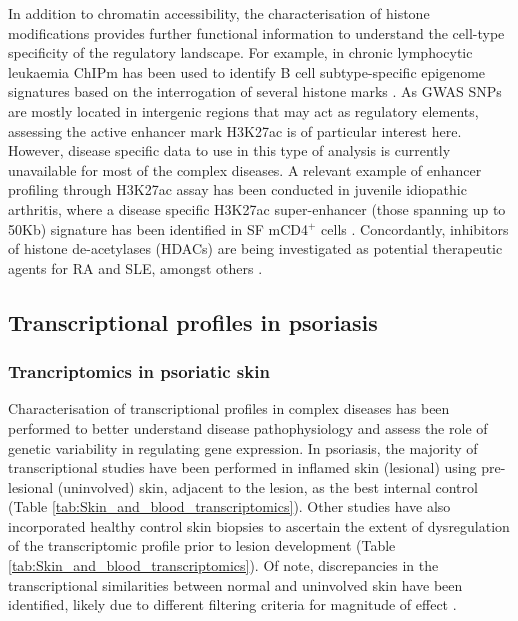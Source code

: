In addition to chromatin accessibility, the characterisation of histone modifications provides further functional information to understand the cell-type specificity of the regulatory landscape. For example, in chronic lymphocytic leukaemia ChIPm has been used to identify B cell subtype-specific epigenome signatures based on the interrogation of several histone marks \parencite{Rendeiro2016}. As GWAS SNPs are mostly located in intergenic regions that may act as regulatory elements, assessing the active enhancer mark H3K27ac is of particular interest here. %
However, disease specific data to use in this type of analysis is currently unavailable for most of the complex diseases. A relevant example of enhancer profiling through H3K27ac assay has been conducted in juvenile idiopathic arthritis, where a disease specific H3K27ac super-enhancer (those spanning up to 50Kb) signature has been identified in SF mCD4$^+$ cells \parencite{Peeters2015}. Concordantly, inhibitors of histone de-acetylases (HDACs) are being investigated as potential therapeutic agents for RA and SLE, amongst others \parencite{Hsieh2014,Shu2017}.




\subsection{Transcriptional profiles in psoriasis}

\subsubsection{Trancriptomics in psoriatic skin}
Characterisation of transcriptional profiles in complex diseases has been performed to better understand disease pathophysiology and assess the role of genetic variability in regulating gene expression. In psoriasis, the majority of transcriptional studies have been performed in inflamed skin (lesional) using pre-lesional (uninvolved) skin, adjacent to the lesion, as the best internal control (Table \ref{tab:Skin_and_blood_transcriptomics}). Other studies have also incorporated healthy control skin biopsies to ascertain the extent of dysregulation of the transcriptomic profile prior to lesion development (Table \ref{tab:Skin_and_blood_transcriptomics}). Of note, discrepancies in the transcriptional similarities between normal and uninvolved skin have been identified, likely due to different filtering criteria for magnitude of effect \parencite{Keermann2015, Tsoi2015}.%

